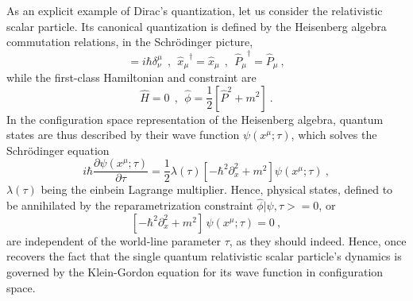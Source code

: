 \documentclass[a4paper,11pt]{article}
\begin{document}
As an explicit example of Dirac's quantization, let us consider the
relativistic scalar particle. Its canonical quantization is defined
by the Heisenberg algebra commutation relations, in the Schr\"odinger
picture,
\begin{equation}
[\hat{x}^\mu,\hat{P}_\nu]=i\hbar\delta^\mu_\nu\ \ ,\ \ 
{\hat{x}_\mu}^\dagger=\hat{x}_\mu\ \ ,\ \ 
{\hat{P}_\mu}^\dagger=\hat{P}_\mu\ ,
\end{equation}
while the first-class Hamiltonian and constraint are
\begin{equation}
\hat{H}=0\ \ ,\ \ \hat{\phi}=\frac{1}{2}\left[\hat{P}^2+m^2\right]\ .
\end{equation}
In the configuration space representation of the Heisenberg algebra,
quantum states are thus described by their wave function $\psi(x^\mu;\tau)$,
which solves the Schr\"odinger equation
\begin{equation}i\hbar\frac{\partial\psi(x^\mu;\tau)}{\partial\tau}=
\frac{1}{2}\lambda(\tau)\left[-\hbar^2\partial^2_x+m^2\right]
\psi(x^\mu;\tau)\ ,
\end{equation}
$\lambda(\tau)$ being the einbein Lagrange multiplier. Hence, physical states,
defined to be annihilated by the reparametrization constraint
$\hat{\phi}|\psi,\tau>=0$, or
\begin{equation}
\left[-\hbar^2\partial^2_x+m^2\right]\,\psi(x^\mu;\tau)=0\ ,
\end{equation}
are independent of the world-line parameter $\tau$, as they should indeed.
Hence, once recovers the fact that the single quantum relativistic scalar
particle's dynamics is governed by the Klein-Gordon equation for its
wave function in configuration space.
\end{document}
